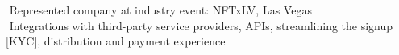\begin{cvtable}
{\textperiodcentered $ $
  Represented company %
  at industry event: NFTxLV, Las Vegas \\
\textperiodcentered $ $
Integrations with third-party service providers,
APIs,
  streamlining
  the signup [KYC],
  distribution and
  payment experience %
} \\

%

\end{cvtable}

